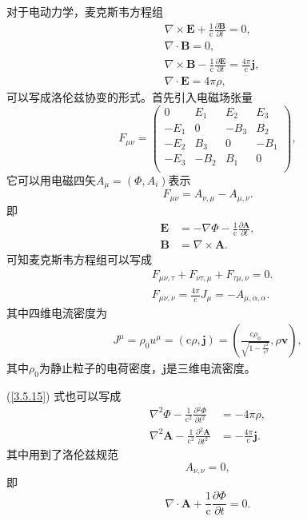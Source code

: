 \documentclass[11pt, a4paper, oneside, onecolumn]{ctexart}
\numberwithin{equation}{subsection}
\begin{document}
对于电动力学，麦克斯韦方程组
\begin{align}
&\nabla\times\boldsymbol{E}+\frac{1}{\mathrm{c}}\frac{\partial{}\boldsymbol{B}}{\partial{}t}=0,\\
&\nabla\cdot\boldsymbol{B}=0,\\
&\nabla\times\boldsymbol{B}-\frac{1}{\mathrm{c}}\frac{\partial{}\boldsymbol{E}}{\partial{}t}=\frac{4\pi}{\mathrm{c}}\boldsymbol{j},\\
&\nabla\cdot\boldsymbol{E}=4\pi\rho,
\end{align}
可以写成洛伦兹协变的形式。首先引入电磁场张量
\begin{equation}
F_{\mu\nu}=\begin{pmatrix}
0 & E_{1} & E_{2} & E_{3}\\
-E_{1} & 0 & -B_{3} & B_{2}\\
-E_{2} & B_{3} & 0 & -B_{1}\\
-E_{3} & -B_{2} & B_{1} & 0\\
\end{pmatrix},
\end{equation}
它可以用电磁四矢$A_{\mu}=\left(\Phi,A_{i}\right)$表示
\begin{equation}
F_{\mu\nu}=A_{\nu,\mu}-A_{\mu,\nu}.
\end{equation}
即
\begin{align}
\boldsymbol{E}&=-\nabla\Phi-\frac{1}{\mathrm{c}}\frac{\partial{}\boldsymbol{A}}{\partial{}t},\\
\boldsymbol{B}&=\nabla\times\boldsymbol{A}.
\end{align}
可知麦克斯韦方程组可以写成
\begin{align}
&F_{\mu\nu,\tau}+F_{\nu\tau,\mu}+F_{\tau\mu,\nu}=0.\\
&F_{\mu\nu,\nu}=\frac{4\pi}{\mathrm{c}}J_{\mu}=-A_{\mu,\alpha,\alpha}.\label{3.5.15}
\end{align}
其中四维电流密度为
\begin{align}
J^{\mu}=\rho_{0}u^{\mu}=\left(\mathrm{c}\rho,\boldsymbol{j}\right)=\left(\frac{\mathrm{c}\rho_{0}}{\sqrt{1-\frac{v^{2}}{\mathrm{c}^{2}}}},\rho\boldsymbol{v}\right),
\end{align}
其中$\rho_{0}$为静止粒子的电荷密度，$\boldsymbol{j}$是三维电流密度。

(\ref{3.5.15}) 式也可以写成
\begin{align}
\nabla^{2}\Phi-\frac{1}{\mathrm{c}^{2}}\frac{\partial{}^{2}\Phi}{\partial{}t^{2}}&=-4\pi\rho,\\
\nabla^{2}\boldsymbol{A}-\frac{1}{\mathrm{c}^{2}}\frac{\partial{}^{2}\boldsymbol{A}}{\partial{}t^{2}}&=-\frac{4\pi}{\mathrm{c}}\boldsymbol{j}.
\end{align}
其中用到了洛伦兹规范
\begin{equation}
A_{\nu,\nu}=0,
\end{equation}
即
\begin{equation}
\nabla\cdot\boldsymbol{A}+\frac{1}{\mathrm{c}}\frac{\partial{}\Phi}{\partial{}t}=0.
\end{equation}
\end{document}
